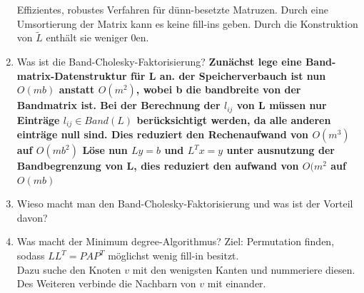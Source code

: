 \documentclass[10pt,a4paper,titlepage]{article}
\newcommand{\chf}{Cholesky-Faktorisierung\xspace}
\begin{document}
\begin{enumerate}[resume=b]
	Effizientes, robustes Verfahren für dünn-besetzte Matruzen. Durch eine Umsortierung der Matrix kann es keine fill-ins geben. Durch die Konstruktion von $\tilde{L}$ enthält sie weniger 0en.
	\item Was ist die Band-\chf? \newline
	\textbf{Zunächst lege eine Band-matrix-Datenstruktur für L an. der Speicherverbauch ist nun $O(mb)$ anstatt $O(m^2)$, wobei b die bandbreite von der Bandmatrix ist. Bei der Berechnung der $l_{ij}$ von L müssen nur Einträge $l_{ij} \in Band(L)$ berücksichtigt werden, da alle anderen einträge null sind. Dies reduziert den Rechenaufwand von $O(m^3)$ auf $O(mb^2)$
		Löse nun $Ly=b$ und $L^Tx=y$ unter ausnutzung der Bandbegrenzung von L, dies reduziert den aufwand von $O(m^2$ auf $O(mb)$}
	\item Wieso macht man den Band-\chf und was ist der Vorteil davon?
	\item Was macht der Minimum degree-Algorithmus?\newline
	Ziel: Permutation finden, sodass $LL^T=PAP^T$ möglichst wenig fill-in besitzt.\\
	Dazu suche den Knoten $v$ mit den wenigsten Kanten und nummeriere diesen. Des Weiteren verbinde die Nachbarn von $v$ mit einander.
\end{enumerate}
\end{document}
